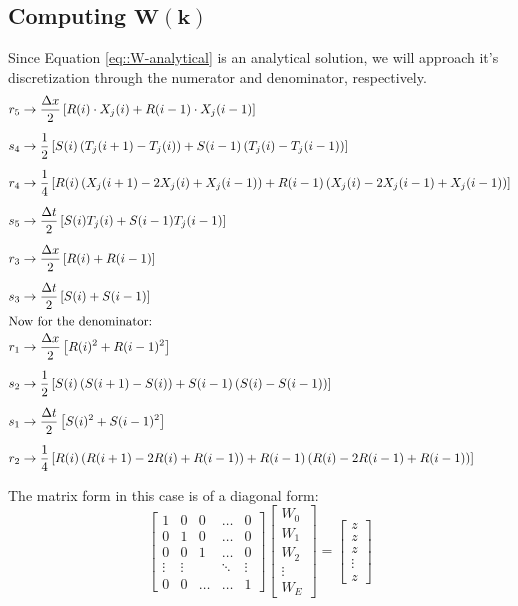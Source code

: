 \documentclass{article}
\begin{document}
\subsection{Computing $\mathbf{W(k)}$}
Since Equation \ref{eq::W-analytical} is an analytical solution, we will approach it's discretization through the numerator and denominator, respectively.
\begin{subequations}
\begin{align*}
r_5 &\to \frac{\Delta x}{2} \left[ R(i)\cdot X_j(i) + R(i-1)\cdot X_j(i-1) \right] \\[5pt]
s_4 &\to \frac{1}{2} \left[ S(i) \left(T_j(i+1) - T_j(i)\right)  + S(i-1) \left( T_j(i) - T_j(i-1) \right) \right]\\[5pt]
r_4 &\to \frac{1}{4} \left[ R(i) \left(X_j(i+1)-2X_j(i)+X_j(i-1)\right) + R(i-1) \left( X_j(i)-2X_j(i-1)+X_j(i-1)\right) \right] \\[5pt]
s_5 &\to \frac{\Delta t}{2} \left[ S(i)T_j(i) + S(i-1)T_j(i-1) \right] \\[5pt]
r_3 &\to \frac{\Delta x}{2} \left[ R(i) + R(i-1) \right] \\[5pt]
s_3 &\to \frac{\Delta t}{2} \left[ S(i) + S(i-1) \right] \\
\intertext{Now for the denominator:}
r_1 &\to \frac{\Delta x}{2} \left[ R(i)^2 + R(i-1)^2 \right] \\[5pt]
s_2 &\to \frac{1}{2} \left[ S(i) \left(S(i+1) - S(i)\right)  + S(i-1) \left( S(i) - S(i-1) \right) \right]\\[5pt]
s_1 &\to \frac{\Delta t}{2} \left[ S(i)^2 + S(i-1)^2 \right] \\[5pt]
r_2 &\to \frac{1}{4} \left[ R(i) \left(R(i+1)-2R(i)+R(i-1)\right) + R(i-1) \left( R(i)-2R(i-1)+R(i-1)\right) \right]
\end{align*}
\end{subequations}

The matrix form in this case is of a diagonal form:
\begin{equation}
\begin{bmatrix}
1 & 0 & 0 & \dots & 0 \\
0 & 1 & 0 & \dots & 0 \\
0 & 0 & 1 & \dots & 0 \\
\vdots & \vdots &  & \ddots & \vdots\\ 
0 & 0 &  \dots  &\dots & 1
\end{bmatrix}
\begin{bmatrix}
W_0 \\ W_1 \\ W_2 \\ \vdots \\ W_E
\end{bmatrix}
= \begin{bmatrix}
z \\ z \\ z \\ \vdots  \\ z
\end{bmatrix}
\end{equation}
\end{document}
